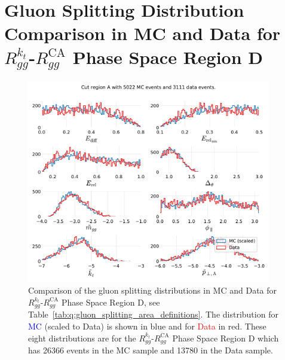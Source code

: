 \section[Gluon Splitting Distribution Comparison in MC and Data for Phase Space Region D]{Gluon Splitting Distribution Comparison in MC and Data for $R_{gg}^{k_t}$-$R_{gg}^\mathrm{CA}$ Phase Space Region D}
\begin{figure}[h!]
  \centerfloat
  \includegraphics[width=0.95\textwidth, trim=0 0 0 0, clip, page=4]{figures/quarks/gtag-R_kt_CA_histograms-down_sample=1.00-ML_vars=vertex-selection=b-ejet_min=4-n_iter_RS_lgb=99-n_iter_RS_xgb=9-cdot_cut=0.90-version=19-njet=4.pdf}
  \caption[Gluon Splitting Distribution Comparison in MC and Data for Phase Space Region D]
          {Comparison of the gluon splitting distributions in MC and Data for $R_{gg}^{k_t}$-$R_{gg}^\mathrm{CA}$ Phase Space Region D, see Table~\ref{tab:q:gluon_splitting_area_definitions}. The distribution for \textcolor{blue}{MC} (scaled to Data) is shown in blue and for \textcolor{red}{Data} in red. These eight distributions are for the $R_{gg}^{k_t}$-$R_{gg}^\mathrm{CA}$ Phase Space Region D which has \num{26366} events in the MC sample and \num{13780} in the Data sample. } 
  \label{fig:q:R_kt_CA_cut_D}
\end{figure}